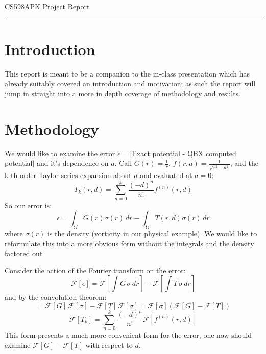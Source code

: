 \documentclass[letterpaper,10pt]{article}
\begin{document}
\begin{flushright}
{\Large CS598APK Project Report}
\end{flushright}
\vskip -0.1in
\hrule
\vskip 0.4in

\vskip 0.1in
\section*{Introduction}
This report is meant to be a companion to the in-class presentation which has already suitably covered an introduction and motivation; as such the report will jump in straight into a more in depth coverage of methodology and results. \vskip 0.1in

\section*{Methodology}
We would like to examine the error $\epsilon = |$Exact potential - QBX computed potential$|$ and it's dependence on $a$. Call $G(r) = \frac{1}{r}$, $f(r,a) = \frac{1}{\sqrt{r^2+a^2}}$, and the k-th order Taylor series expansion about $d$ and evaluated at $a=0$: 
$$T_k(r,d) = \sum^k_{n=0}\frac{(-d)^n}{n!}f^{(n)}(r,d)$$
So our error is: $$\epsilon = \int_\Omega G(r) \sigma(r) \, dr - \int_\Omega T(r,d) \sigma(r) \, dr$$ where $\sigma(r)$ is the density (vorticity in our physical example). We would like to reformulate this into a more obvious form without the integrals and the density factored out

Consider the action of the Fourier transform on the error:
$$\mathcal{F}[\epsilon] = \mathcal{F}\left[ \int G \, \sigma \, dr \right] - \mathcal{F}\left[ \int T \, \sigma \, dr \right]$$
and by the convolution theorem:
$$= \mathcal{F}[G] \, \mathcal{F}[\sigma] - \mathcal{F}[T]\,\mathcal{F}[\sigma] = \mathcal{F}[\sigma] \left(\mathcal{F}[G] - \mathcal{F}[T]\right)  $$
$$\mathcal{F}[T_k] = \sum_{n=0}^k \frac{(-d)^n}{n!} \mathcal{F}[f^{(n)}(r,d)]$$
This form presents a much more convenient form for the error, one now should examine $\mathcal{F}[G] - \mathcal{F}[T]$ with respect to $d$.
\end{document}
